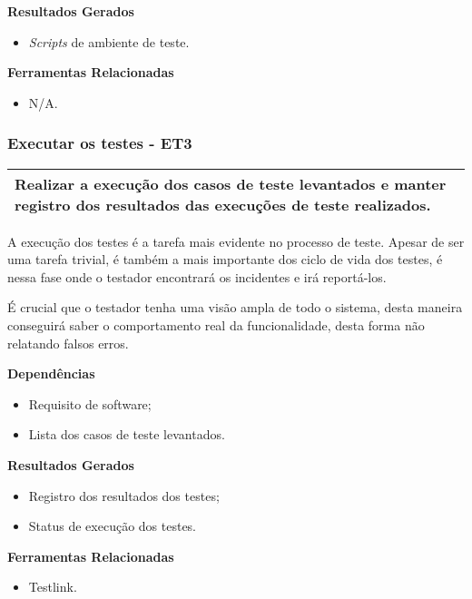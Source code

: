 \textbf{Resultados Gerados}
\begin{itemize}
    \item \textit{Scripts} de ambiente de teste.
\end{itemize}

\textbf{Ferramentas Relacionadas}
\begin{itemize}
    \item N/A.
\end{itemize}


\subsubsection{Executar os testes - ET3}
\label{sec:et3}

\begin{table}[!ht]
\centering
\begin{tabular}{|p{130mm}|}
\hline
Realizar a execução dos casos de teste levantados e manter registro dos resultados das execuções de teste realizados. \\ 
\hline
\end{tabular}
\end{table}

A execução dos testes é a tarefa mais evidente no processo de teste. Apesar de ser uma tarefa trivial, é também a mais importante dos ciclo de vida dos testes, é nessa fase onde o testador encontrará os incidentes e irá reportá-los.

É crucial que o testador tenha uma visão ampla de todo o sistema, desta maneira conseguirá saber o comportamento real da funcionalidade, desta forma não relatando falsos erros.

\textbf{Dependências}
\begin{itemize}
    \item Requisito de software;
    \item Lista dos casos de teste levantados.
\end{itemize}

\textbf{Resultados Gerados}
\begin{itemize}
    \item Registro dos resultados dos testes;
    \item Status de execução dos testes.
\end{itemize}

\textbf{Ferramentas Relacionadas}
\begin{itemize}
    \item Testlink.
\end{itemize}


